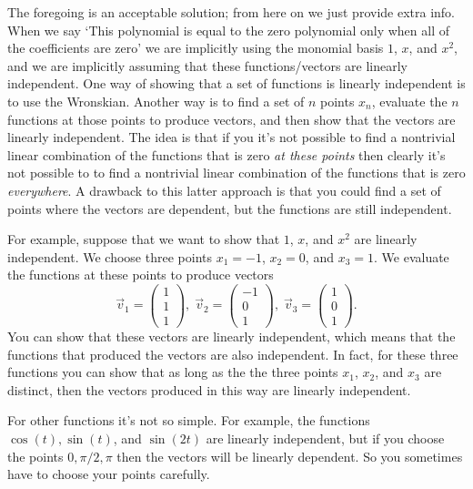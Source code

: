 \documentclass[11pt,fleqn]{article}
\begin{document}
\begin{enumerate}
The foregoing is an acceptable solution; from here on we just provide extra info.
When we say `This polynomial is equal to the zero polynomial only when all of the coefficients are zero' we are implicitly using the monomial basis $1$, $x$, and $x^2$, and we are implicitly assuming that these functions/vectors are linearly independent.
One way of showing that a set of functions is linearly independent is to use the Wronskian.
Another way is to find a set of $n$ points $x_n$, evaluate the $n$ functions at those points to produce vectors, and then show that the vectors are linearly independent.
The idea is that if you it's not possible to find a nontrivial linear combination of the functions that is zero {\it at these points} then clearly it's not possible to to find a nontrivial linear combination of the functions that is zero {\it everywhere}.
A drawback to this latter approach is that you could find a set of points where the vectors are dependent, but the functions are still independent.

For example, suppose that we want to show that $1$, $x$, and $x^2$ are linearly independent.
We choose three points $x_1 = -1$, $x_2 = 0$, and $x_3 = 1$.
We evaluate the functions at these points to produce vectors
\[\vec{v}_1 = \left(\begin{array}{c}1\\1\\1\end{array}\right),\;\vec{v}_2 = \left(\begin{array}{c}-1\\0\\1\end{array}\right),\;\vec{v}_3 = \left(\begin{array}{c}1\\0\\1\end{array}\right).\]
You can show that these vectors are linearly independent, which means that the functions that produced the vectors are also independent.
In fact, for these three functions you can show that as long as the the three points $x_1$, $x_2$, and $x_3$ are distinct, then the vectors produced in this way are linearly independent.

For other functions it's not so simple. For example, the functions $\cos(t), \sin(t)$, and $\sin(2t)$ are linearly independent, but if you choose the points $0,\pi/2,\pi$ then the vectors will be linearly dependent.
So you sometimes have to choose your points carefully.


\end{enumerate}
\end{document}
